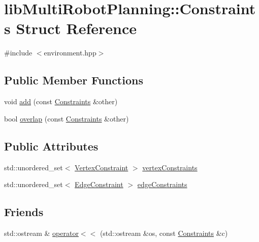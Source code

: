 \hypertarget{structlib_multi_robot_planning_1_1_constraints}{}\section{lib\+Multi\+Robot\+Planning\+:\+:Constraints Struct Reference}
\label{structlib_multi_robot_planning_1_1_constraints}


{\ttfamily \#include $<$environment.\+hpp$>$}

\subsection*{Public Member Functions}
\begin{DoxyCompactItemize}
\item 
void \hyperlink{structlib_multi_robot_planning_1_1_constraints_a62073ccf7e07c6ad80ec809affdf3a81}{add} (const \hyperlink{structlib_multi_robot_planning_1_1_constraints}{Constraints} \&other)
\item 
bool \hyperlink{structlib_multi_robot_planning_1_1_constraints_a572feb308aed241ee52970e0ac2a1c16}{overlap} (const \hyperlink{structlib_multi_robot_planning_1_1_constraints}{Constraints} \&other)
\end{DoxyCompactItemize}
\subsection*{Public Attributes}
\begin{DoxyCompactItemize}
\item 
std\+::unordered\+\_\+set$<$ \hyperlink{structlib_multi_robot_planning_1_1_vertex_constraint}{Vertex\+Constraint} $>$ \hyperlink{structlib_multi_robot_planning_1_1_constraints_a1eeb8ac7de1947d7cbde33d24d2afefe}{vertex\+Constraints}
\item 
std\+::unordered\+\_\+set$<$ \hyperlink{structlib_multi_robot_planning_1_1_edge_constraint}{Edge\+Constraint} $>$ \hyperlink{structlib_multi_robot_planning_1_1_constraints_aec17e4c178b74398a68c1ad9a5d866b4}{edge\+Constraints}
\end{DoxyCompactItemize}
\subsection*{Friends}
\begin{DoxyCompactItemize}
\item 
std\+::ostream \& \hyperlink{structlib_multi_robot_planning_1_1_constraints_a609a032077973e41f300c88a62d8f6fa}{operator$<$$<$} (std\+::ostream \&os, const \hyperlink{structlib_multi_robot_planning_1_1_constraints}{Constraints} \&c)
\end{DoxyCompactItemize}


